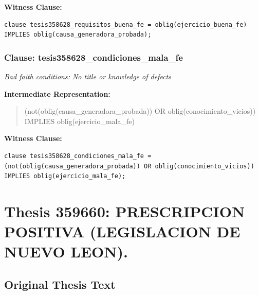 \documentclass[11pt,a4paper]{article}
\begin{document}
\textbf{Witness Clause:}

\begin{lstlisting}[style=witnessstyle, language=Witness]
clause tesis358628_requisitos_buena_fe = oblig(ejercicio_buena_fe) IMPLIES oblig(causa_generadora_probada);
\end{lstlisting}

\subsubsection{Clause: tesis358628\_condiciones\_mala\_fe}

\textit{Bad faith conditions: No title or knowledge of defects}

\textbf{Intermediate Representation:}

\begin{quote}
(not(oblig(causa\_generadora\_probada)) OR oblig(conocimiento\_vicios)) IMPLIES oblig(ejercicio\_mala\_fe)
\end{quote}

\textbf{Witness Clause:}

\begin{lstlisting}[style=witnessstyle, language=Witness]
clause tesis358628_condiciones_mala_fe = (not(oblig(causa_generadora_probada)) OR oblig(conocimiento_vicios)) IMPLIES oblig(ejercicio_mala_fe);
\end{lstlisting}

\newpage

\section{Thesis 359660: PRESCRIPCION POSITIVA (LEGISLACION DE NUEVO LEON).}
\label{thesis:359660}

\subsection{Original Thesis Text}
\end{document}

